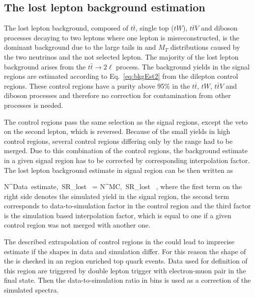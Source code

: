 \subsection{The lost lepton background estimation}

The lost lepton background, composed of $t\bar{t}$, single top ($tW$), $t\bar{t}V$ and diboson processes decaying to two leptons where one lepton is misreconstructed, is the dominant background due to the large tails in \MET and $M_{T}$ distributions caused by the two neutrinos and the not selected lepton. The majority of the lost lepton background arises from the $t\bar{t} \to 2\ell$ process. The background yields in the signal regions are estimated according to Eq.~\ref{eq:bkgEst2} from the dilepton control regions. These control regions have a purity above 95\% in the $t\bar{t}$, $tW$, $t\bar{t}V$ and diboson processes and therefore no correction for contamination from other processes is needed. 

The control regions pass the same selection as the signal regions, except the veto on the second lepton, which is reversed. Because of the small yields in high \MET control regions, several control regions differing only by the \MET range had to be merged. Due to this combination of the control regions, the background estimate in a given signal region has to be corrected by corresponding interpolation factor. The lost lepton background estimate in signal region can be then written as

{
N^{Data~estimate,~SR}_{lost~\ell}  = N^{MC,~SR}_{lost~\ell} \times  {} \times {},
}
where the first term on the right side denotes the simulated yield in the signal region, the second term corresponds to data-to-simulation factor in the control region and the third factor is the simulation based interpolation factor, which is equal to one if a given control region was not merged with another one.

The described extrapolation of control regions in the \MET could lead to imprecise estimate if the \MET shapes in data and simulation differ. For this reason the shape of the \MET is checked in an region enriched top quark events. Data used for definition of this region are triggered by double lepton trigger with electron-muon pair in the final state. Then the data-to-simulation ratio in \MET bins is used as a correction of the simulated \MET spectra. 

